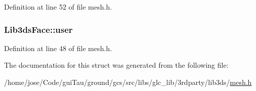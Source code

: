 Definition at line 52 of file mesh.\-h.

\hypertarget{struct_lib3ds_face_a06c51e3d62d2d2ded596fb53cfe49316}{
\subsubsection[{user}]{ Lib3ds\-Face\-::user}}\label{struct_lib3ds_face_a06c51e3d62d2d2ded596fb53cfe49316}


Definition at line 48 of file mesh.\-h.



The documentation for this struct was generated from the following file\-:\begin{DoxyCompactItemize}
\item 
/home/jose/\-Code/gui\-Tau/ground/gcs/src/libs/glc\-\_\-lib/3rdparty/lib3ds/\hyperlink{mesh_8h}{mesh.\-h}\end{DoxyCompactItemize}
